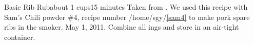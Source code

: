 \newpage
\begin{recipe}{Basic Rib Rub}{about 1 cups}{15 minutes}
\freeform Taken from \emph{}. We used this recipe with Sam's Chili powder \#4, recipe number /home/sgy/\ref{sam4} to make pork spare ribs in the smoker.  May 1, 2011.
Combine all ings and store in an air-tight container.
\end{recipe}
